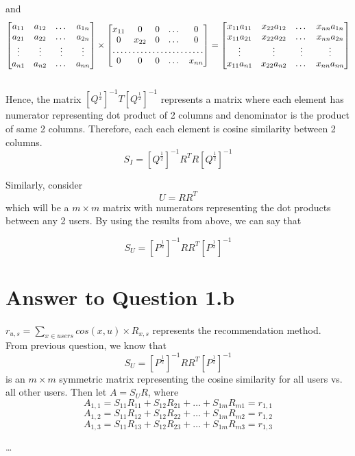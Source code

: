 \documentclass[11pt]{article}
\begin{document}
{and
\[
\begin{bmatrix}
	a_{11} & a_{12} & \dots  & a_{1n} \\
    a_{21} & a_{22} & \dots  & a_{2n} \\
    \vdots & \vdots & \vdots & \vdots \\
    a_{n1} & a_{n2} & \dots  & a_{nn}
\end{bmatrix} \times
\begin{bmatrix}
    x_{11}   & 0 & 0 & \dots &0 \\
    0   & x_{22} & 0 & \dots & 0 \\
    \hdotsfor{5} \\
    0  & 0 & 0 & \dots & x_{nn}
\end{bmatrix}
=
\begin{bmatrix}
	x_{11}a_{11} & x_{22}a_{12} &  \dots  & x_{nn}a_{1n} \\
    x_{11}a_{21} & x_{22}a_{22} & \dots  & x_{nn}a_{2n} \\
    \vdots & \vdots & \vdots & \vdots \\
    x_{11}a_{n1} & x_{22}a_{n2} & \dots  & x_{nn}a_{nn}
\end{bmatrix}
\] \\

Hence, the matrix $[Q^{\frac{1}{2}}]^{-1} T [Q^{\frac{1}{2}}]^{-1}$ represents a matrix where each element has numerator representing dot product of 2 columns and denominator is the product of same 2 columns. Therefore, each each element is cosine similarity between 2 columns. \\

$$S_I = [Q^{\frac{1}{2}}]^{-1} R^TR [Q^{\frac{1}{2}}]^{-1}$$

Similarly, consider $$U = RR^T$$ which will be a $m \times m$ matrix with numerators representing the dot products between any 2 users. By using the results from above, we can say that

$$S_U = [P^{\frac{1}{2}}]^{-1} RR^T [P^{\frac{1}{2}}]^{-1}$$

\pagebreak[4]
\section*{Answer to Question 1.b}

$r_{u,s} = \sum_{x \in users} cos(x, u) \times R_{x,s}$ represents the recommendation method.\\

From previous question, we know that $$S_U = [P^{\frac{1}{2}}]^{-1} RR^T [P^{\frac{1}{2}}]^{-1}$$ is an $m \times m$ symmetric matrix representing the cosine similarity for all users vs. all other users. 
Then let $A = S_UR$, where
$$A_{1,1} = S_{11}R_{11} + S_{12}R_{21} + \hdots + S_{1m}R_{m1} = r_{1,1}$$
$$A_{1,2} = S_{11}R_{12} + S_{12}R_{22} + \hdots + S_{1m}R_{m2} = r_{1,2} $$
$$A_{1,3} = S_{11}R_{13} + S_{12}R_{23} + \hdots + S_{1m}R_{m3} = r_{1,3} $$
\begin{center} {\dots} \end{center}

}
\end{document}
